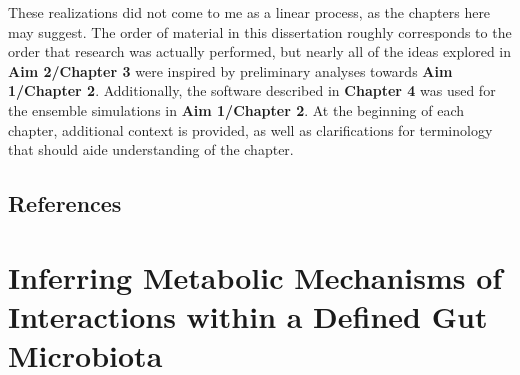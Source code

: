 \documentclass[11pt,twocolumn,notitlepage,openany,twoside]{book}
\begin{document}
\begin{refsection}
These realizations did not come to me as a linear process, as the chapters here may suggest. The order of material in this dissertation roughly corresponds to the order that research was actually performed, but nearly all of the ideas explored in \textbf{Aim 2/Chapter 3} were inspired by preliminary analyses towards \textbf{Aim 1/Chapter 2}. Additionally, the software described in \textbf{Chapter 4} was used for the ensemble simulations in \textbf{Aim 1/Chapter 2}. At the beginning of each chapter, additional context is provided, as well as clarifications for terminology that should aide understanding of the chapter.

\section{References}

\printbibliography[heading=none]
\end{refsection}

\chapter{Inferring Metabolic Mechanisms of Interactions within a Defined Gut Microbiota}
\end{document}
